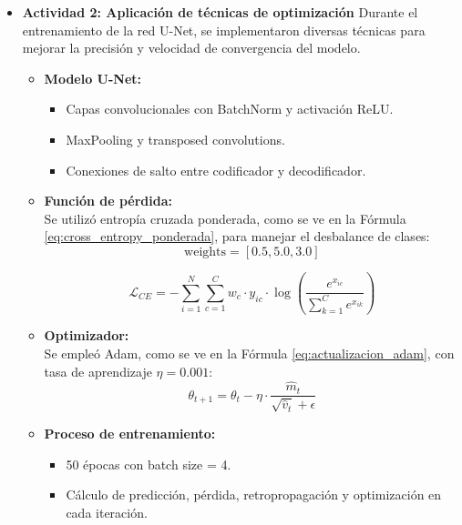 \begin{enumerate}
\begin{itemize}
  \item\textbf{Actividad 2: Aplicación de técnicas de optimización}
  Durante el entrenamiento de la red U-Net, se implementaron diversas técnicas para mejorar la precisión y velocidad de convergencia del modelo.

\begin{itemize}
  \item \textbf{Modelo U-Net:}
  \begin{itemize}
    \item Capas convolucionales con BatchNorm y activación ReLU.
    \item MaxPooling y transposed convolutions.
    \item Conexiones de salto entre codificador y decodificador.
  \end{itemize}
  
  \item \textbf{Función de pérdida:} \\
  Se utilizó entropía cruzada ponderada, como se ve en la Fórmula \ref{eq:cross_entropy_ponderada}, para manejar el desbalance de clases:
  \[
    \text{weights} = [0.5, 5.0, 3.0]
\]

\begin{equation}\label{eq:cross_entropy_ponderada}
  \mathcal{L}_{CE} = - \sum_{i=1}^{N} \sum_{c=1}^{C} w_c \cdot y_{ic} \cdot \log \left( \frac{e^{x_{ic}}}{\sum_{k=1}^{C} e^{x_{ik}}} \right)
\end{equation}

  \item \textbf{Optimizador:} \\
  Se empleó Adam, como se ve en la Fórmula \ref{eq:actualizacion_adam}, con tasa de aprendizaje $\eta = 0.001$:
  \begin{equation}\label{eq:actualizacion_adam}
    \theta_{t+1} = \theta_t - \eta \cdot \frac{\hat{m}_t}{\sqrt{\hat{v}_t} + \epsilon}
\end{equation}

  \item \textbf{Proceso de entrenamiento:}
  \begin{itemize}
    \item 50 épocas con batch size = 4.
    \item Cálculo de predicción, pérdida, retropropagación y optimización en cada iteración.
  \end{itemize}


\end{itemize}
\end{itemize}
\end{enumerate}
